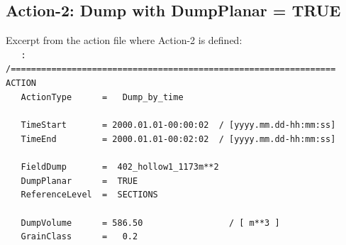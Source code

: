 \subsection{Action-2: Dump with DumpPlanar = TRUE}
Excerpt from the action file where Action-2 is defined:\\
\hspace*{3mm} \texttt{\small{~~~:}}\\
\hspace*{3mm} \texttt{\small{/================================================================}}\\
\hspace*{3mm} \texttt{\small{ACTION}}                                                           \\
\hspace*{3mm} \texttt{\small{~~~ActionType~~~~~~=~~~Dump\_by\_time}}                            \\
\hspace*{3mm} \texttt{\small{~~~}}                                                              \\
\hspace*{3mm} \texttt{\small{~~~TimeStart~~~~~~~=~2000.01.01-00:00:02~~/~[yyyy.mm.dd-hh:mm:ss]}}\\
\hspace*{3mm} \texttt{\small{~~~TimeEnd~~~~~~~~~=~2000.01.01-00:02:02~~/~[yyyy.mm.dd-hh:mm:ss]}}\\
\hspace*{3mm} \texttt{\small{~~~}}                                                              \\
\hspace*{3mm} \texttt{\small{~~~FieldDump~~~~~~~=~~402\_hollow1\_1173m**2}}                     \\
\hspace*{3mm} \texttt{\small{~~~DumpPlanar~~~~~~=~~TRUE~}}                                      \\
\hspace*{3mm} \texttt{\small{~~~ReferenceLevel~~=~~SECTIONS}}                                   \\
\hspace*{3mm} \texttt{\small{~~~}}                                                              \\
\hspace*{3mm} \texttt{\small{~~~DumpVolume~~~~~~=~586.50~~~~~~~~~~~~~~~~~/~[~m**3~]}}           \\
\hspace*{3mm} \texttt{\small{~~~GrainClass~~~~~~=~~~0.2}}                                       \\
